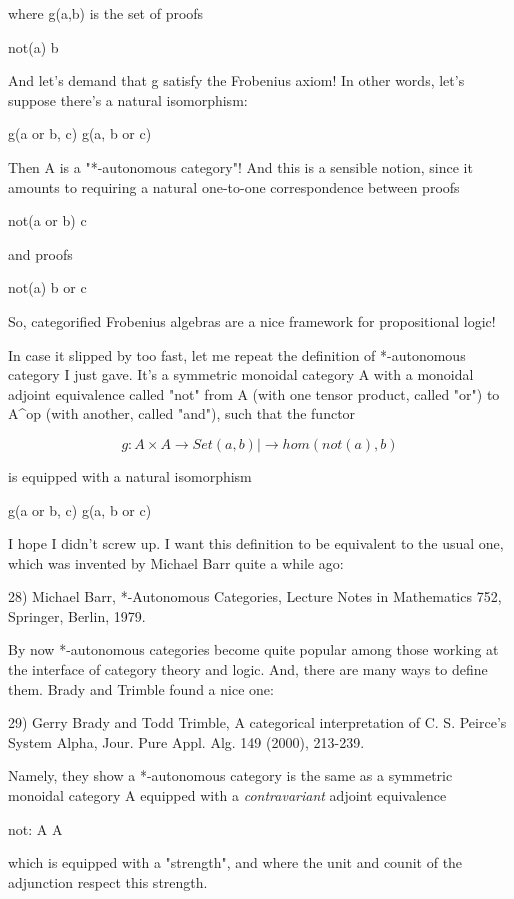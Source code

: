 where g(a,b) is the set of proofs 

not(a) \to  b

And let's demand that g satisfy the Frobenius
axiom!  In other words, let's suppose there's a natural
isomorphism:

g(a or b, c) \cong  g(a, b or c)

Then A is a "*-autonomous category"!  And this is 
a sensible notion, since it amounts to requiring a natural
one-to-one correspondence between proofs

not(a or b) \to  c

and proofs

not(a) \to  b or c

So, categorified Frobenius algebras are a nice framework for
propositional logic!

In case it slipped by too fast, let me repeat the definition of
*-autonomous category I just gave.  It's a symmetric monoidal
category A with a monoidal adjoint
equivalence called "not" from A (with one tensor product,
called "or") to A^{op} (with another, called 
"and"), such that the functor 


$$

g: A \times  A  \to  Set
   (a,b) |\to  hom(not(a),b)
$$
    

is equipped with a natural isomorphism 

g(a or b, c) \cong  g(a, b or c)

I hope I didn't screw up.  I want this definition to
be equivalent to the usual one,
which was invented by Michael Barr quite a while ago:

28) Michael Barr, *-Autonomous Categories, Lecture Notes in 
Mathematics 752, Springer, Berlin, 1979.

By now *-autonomous categories become quite popular among those
working at the interface of category theory and logic.  And, there
are many ways to define them.  Brady and Trimble found a nice one:

29) Gerry Brady and Todd Trimble, A categorical interpretation 
of C. S. Peirce's System Alpha, Jour. Pure Appl. Alg. 149
(2000), 213-239.  

Namely, they show a *-autonomous category is the same as a symmetric
monoidal category A equipped with a \emph{contravariant} 
adjoint equivalence

not: A \to  A 

which is equipped with a "strength", and where the unit and counit of 
the adjunction respect this strength.

